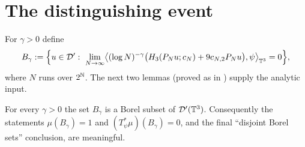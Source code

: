 \section*{The distinguishing event}

For $\gamma>0$ define
\[
B_\gamma:=\Bigl\{u\in\qoneD':\ \lim_{N\to\infty}\bigl\langle(\log N)^{-\gamma}\bigl(\qoneHp_3(\qonePN u;c_N)+9c_{N,2}\qonePN u\bigr),\psi\bigr\rangle_{\qoneT^3}=0\Bigr\},
\]
where $N$ runs over $2^{\mathbb{N}}$. The next two lemmas (proved as in
\cite[Lems.~3.11--3.12]{HKN24}) supply the analytic input.

\begin{qonelemma}[Measurability]\label{lem:borel}
For every $\gamma>0$ the set $B_\gamma$ is a Borel subset of $\mathcal{D}'(\mathbb{T}^3)$.
Consequently the statements $\mu(B_\gamma)=1$ and $(T_\psi^*\mu)(B_\gamma)=0$, and
the final ``disjoint Borel sets'' conclusion, are meaningful.
\end{qonelemma}

